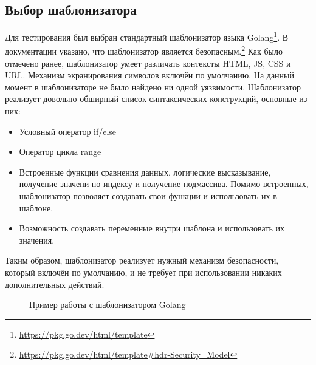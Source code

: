 \documentclass[a4paper]{article}
\begin{document}
\subsection{Выбор шаблонизатора}
\indent

Для тестирования был выбран стандартный шаблонизатор языка Golang\footnote{\href{https://pkg.go.dev/html/template}{https://pkg.go.dev/html/template}}. В документации указано, что шаблонизатор является безопасным.\footnote{\href{https://pkg.go.dev/html/template\#hdr-Security\_Model}{https://pkg.go.dev/html/template\#hdr-Security\_Model}} Как было отмечено ранее, шаблонизатор умеет различать контексты HTML, JS, CSS и URL. Механизм экранирования символов включён по умолчанию. На данный момент в шаблонизаторе не было найдено ни одной уязвимости. Шаблонизатор реализует довольно обширный список синтаксических конструкций, основные из них: 
\begin{itemize}
    \item Условный оператор if/else
    \item Оператор цикла range
    \item Встроенные функции сравнения данных, логические высказывание, получение значени по индексу и получение подмассива. Помимо встроенных, шаблонизатор позволяет создавать свои функции и использовать их в шаблоне.
    \item Возможность создавать переменные внутри шаблона и использовать их значения.
\end{itemize}
Таким образом, шаблонизатор реализует нужный механизм безопасности, который включён по умолчанию, и не требует при использовании никаких дополнительных действий.
\begin{figure}[!tbp]
    \centering
    \hfill
    \caption{Пример работы с шаблонизатором Golang}
    \label{GoExample}
    \end{figure}
\end{document}
